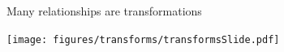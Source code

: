 \documentclass[aspectratio=169]{beamer}
\begin{document}
%
%
%
%
%
%

\begin{frame}{Many relationships are transformations}

\vspace{0.8em}
\begin{center}
  \texttt{[image: figures/transforms/transformsSlide.pdf]}
\end{center}

\end{frame}
\end{document}

